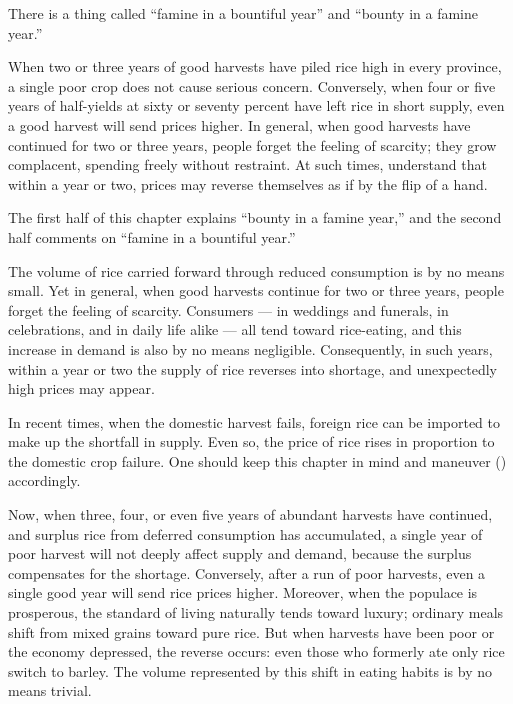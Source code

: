 
\begin{sokyubox}
{\small\itshape\color{sokyubar} }

\medskip
There is a thing called ``famine in a bountiful year'' and ``bounty in
a famine year.''

When two or three years of good harvests have piled rice high in
every province, a single poor crop does not cause serious concern.
Conversely, when four or five years of half-yields at sixty or
seventy percent have left rice in short supply, even a good harvest
will send prices higher. In general, when good harvests have
continued for two or three years, people forget the feeling of
scarcity; they grow complacent, spending freely without restraint.
At such times, understand that within a year or two, prices may
reverse themselves as if by the flip of a hand.
\end{sokyubox}

\commentary
The first half of this chapter explains ``bounty in a famine year,''
and the second half comments on ``famine in a bountiful year.''

The volume of rice carried forward through reduced consumption is by
no means small. Yet in general, when good harvests continue for two
or three years, people forget the feeling of scarcity. Consumers ---
in weddings and funerals, in celebrations, and in daily life alike ---
all tend toward rice-eating, and this increase in demand is also by
no means negligible. Consequently, in such years, within a year or
two the supply of rice reverses into shortage, and unexpectedly high
prices may appear.

In recent times, when the domestic harvest fails, foreign rice can be
imported to make up the shortfall in supply. Even so, the price of
rice rises in proportion to the domestic crop failure. One should
keep this chapter in mind and maneuver () accordingly.

Now, when three, four, or even five years of abundant harvests have
continued, and surplus rice from deferred consumption has accumulated,
a single year of poor harvest will not deeply affect supply and
demand, because the surplus compensates for the shortage. Conversely,
after a run of poor harvests, even a single good year will send rice
prices higher. Moreover, when the populace is prosperous, the
standard of living naturally tends toward luxury; ordinary meals shift
from mixed grains toward pure rice. But when harvests have been poor
or the economy depressed, the reverse occurs: even those who formerly
ate only rice switch to barley. The volume represented by this shift
in eating habits is by no means trivial.

